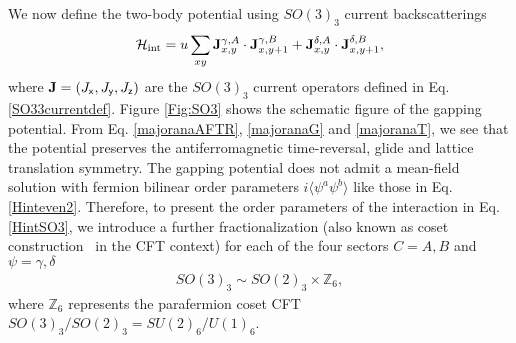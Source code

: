 We now define the two-body potential using $SO(3)_3$ current backscatterings \begin{align}\mathcal{H}_{\mathrm{int}}=u\sum_{xy}{\bf J}^{\gamma,A}_{x,y}\cdot{\bf J}^{\gamma,B}_{x,y+1}+{\bf J}^{\delta,A}_{x,y}\cdot{\bf J}^{\delta,B}_{x,y+1},\label{HintSO3}\end{align} where ${\bf J}=(J_{\mathsf{x}},J_{\mathsf{y}},J_{\mathsf{z}})$ are the $SO(3)_3$ current operators defined in Eq. \eqref{SO33currentdef}. Figure \ref{Fig:SO3} shows the schematic figure of the gapping potential. From Eq. \eqref{majoranaAFTR}, \eqref{majoranaG} and \eqref{majoranaT}, we see that the potential preserves the antiferromagnetic time-reversal, glide and lattice translation symmetry. The gapping potential does not admit a mean-field solution with fermion bilinear order parameters $i\langle\psi^a\psi^b\rangle$ like those in Eq. \eqref{Hinteven2}. Therefore, to present the order parameters of the interaction in Eq. \eqref{HintSO3}, we introduce a further fractionalization (also known as coset construction~\cite{bigyellowbook} in the CFT context) for each of the four sectors $C=A,B$ and $\psi=\gamma,\delta$ \begin{align}SO(3)_3\sim SO(2)_3\times\mathbb{Z}_6,\label{Z6parafermion}\end{align} where $\mathbb{Z}_6$ represents the parafermion coset CFT~\cite{FateevZamolodchikov82,ZamolodchikovFateev85} $SO(3)_3/SO(2)_3=SU(2)_6/U(1)_6$.

